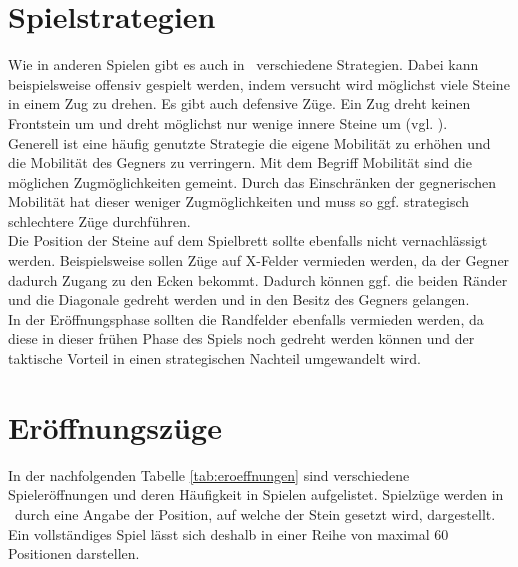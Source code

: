 \section{Spielstrategien}
\label{strat1}
Wie in anderen Spielen gibt es auch in \ot\ verschiedene Strategien. Dabei kann beispielsweise offensiv gespielt werden, indem versucht wird möglichst viele Steine in einem Zug zu drehen. Es gibt auch defensive  Züge. Ein  Zug dreht keinen Frontstein um und dreht möglichst nur wenige innere Steine um (vgl. \cite{Ortiz.}).
\\ Generell ist eine häufig genutzte Strategie die eigene Mobilität zu erhöhen und die Mobilität des Gegners zu verringern. Mit dem Begriff Mobilität sind die möglichen Zugmöglichkeiten gemeint. Durch das Einschränken der gegnerischen Mobilität hat dieser weniger Zugmöglichkeiten und muss so ggf. strategisch schlechtere Züge durchführen.
\\Die Position der Steine auf dem Spielbrett sollte ebenfalls nicht vernachlässigt werden.
Beispielsweise sollen Züge auf X-Felder vermieden werden, da der Gegner dadurch Zugang zu den Ecken bekommt. Dadurch können ggf. die beiden Ränder und die Diagonale gedreht werden und in den Besitz des Gegners gelangen.
\\In der Eröffnungsphase sollten die Randfelder ebenfalls vermieden werden, da diese in dieser frühen Phase des Spiels noch gedreht werden können und der taktische Vorteil in einen strategischen Nachteil umgewandelt wird.
\section{Eröffnungszüge}
\label{othello-eroff}
In der nachfolgenden Tabelle \ref{tab:eroeffnungen} sind verschiedene Spieleröffnungen und deren Häufigkeit in Spielen aufgelistet. Spielzüge werden in \ot\ durch eine Angabe der Position, auf welche der Stein gesetzt wird, dargestellt. Ein vollständiges Spiel lässt sich deshalb in einer Reihe von maximal 60 Positionen darstellen.

